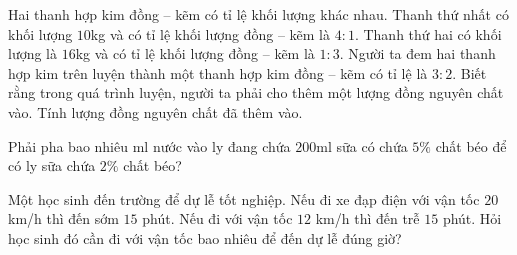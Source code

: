 \begin{bt}%
Hai thanh hợp kim đồng – kẽm có tỉ lệ khối lượng khác nhau. Thanh thứ nhất có khối lượng $10$kg và có tỉ lệ khối lượng đồng – kẽm là $4:1$. Thanh thứ hai có khối lượng là $16$kg và có tỉ lệ khối lượng đồng – kẽm là $1:3$. Người ta đem hai thanh hợp kim trên luyện thành một thanh hợp kim đồng – kẽm có tỉ lệ là $3:2$. Biết rằng trong quá trình luyện, người ta phải cho thêm một lượng đồng nguyên chất vào. Tính lượng đồng nguyên chất đã thêm vào. 	
\end{bt}

\begin{bt}%
Phải pha bao nhiêu ml nước vào ly đang chứa $200$ml sữa có chứa $5\%$ chất béo để có ly sữa chứa $2\%$ chất béo?	
\end{bt}

\begin{bt}%
Một học sinh đến trường để dự lễ tốt nghiệp. Nếu đi xe đạp điện với vận tốc $20$ km/h thì đến sớm $15$ phút. Nếu đi với vận tốc $12$ km/h thì đến trễ $15$ phút. Hỏi học sinh đó cần đi với vận tốc bao nhiêu để đến dự lễ đúng giờ?
	
\end{bt}

